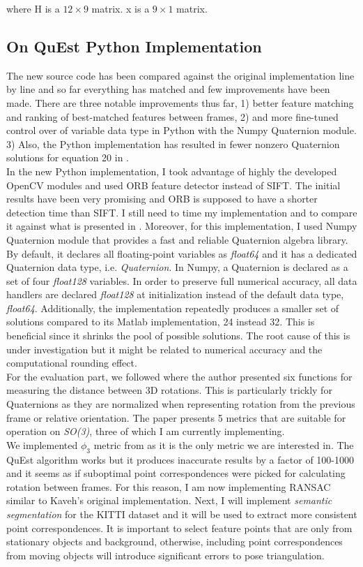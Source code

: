 \documentclass[letterpaper, 10 pt, conference]{ieeeconf}  %
\begin{document}
\noindent
where H is a \(12 \times 9\) matrix. x is a \(9 \times 1\) matrix.




\subsection{On QuEst Python Implementation}
The new source code has been compared against the original implementation line by line
and so far everything has matched and few improvements have been made. There are
three notable improvements thus far, 1) better feature matching and ranking
of best-matched features between frames, 2) and more fine-tuned control
over of variable data type in Python with the Numpy Quaternion module. 3) Also,
the Python implementation has resulted in fewer nonzero Quaternion solutions
for equation 20 in \cite{quest}.\\
In the new Python implementation, I took advantage of highly the developed
OpenCV modules and used ORB feature detector instead of SIFT. The initial
results have been very promising and ORB is supposed to have a shorter
detection time than SIFT. I still need to time my implementation and
to compare it against what is presented in \cite{quest}. Moreover, for this
implementation, I used Numpy Quaternion module that provides a fast and
reliable Quaternion algebra library. By default, it declares all
floating-point variables as \emph{float64} and it has a dedicated Quaternion data
type, i.e. \emph{Quaternion}. In Numpy, a Quaternion is declared as a set
of four \emph{float128} variables. In order to preserve full numerical
accuracy, all data handlers are declared \emph{float128} at initialization
instead of the default data type, \emph{float64}. Additionally, the
implementation repeatedly produces a smaller set of solutions compared to
its Matlab implementation, 24 instead 32. This is beneficial since it shrinks
the pool of possible solutions. The root cause of this is under
investigation but it might be related to numerical accuracy and the
computational rounding effect.\\
For the evaluation part, we followed \cite{huynh2009metrics}
where the author presented six functions for measuring the distance between 3D
rotations. This is particularly trickly for Quaternions as they are
normalized when representing rotation from the previous frame or relative
orientation. The paper presents 5 metrics that are suitable for operation
on \emph{SO(3)}, three of which I am currently implementing.\\
We implemented \(\phi_3\) metric from \cite{huynh2009metrics} as it is the
only metric we are interested in. The QuEst algorithm works but it produces
inaccurate results by a factor of 100-1000 and it seems as
if suboptimal point correspondences were picked for calculating rotation
between frames. For this reason, I am now implementing RANSAC similar to
Kaveh's original implementation. Next, I will implement \emph{semantic
segmentation} for the KITTI dataset and it will be used to extract more
consistent point correspondences. It is important to select feature points
that are only from stationary objects and background, otherwise, including
point correspondences from moving objects will introduce significant errors
to pose triangulation.
\end{document}
